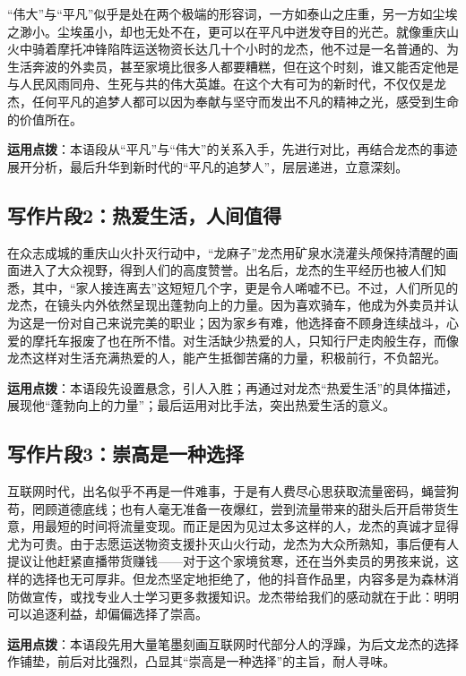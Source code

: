 “伟大”与“平凡”似乎是处在两个极端的形容词，一方如泰山之庄重，另一方如尘埃之渺小。尘埃虽小，却也无处不在，更可以在平凡中迸发夺目的光芒。就像重庆山火中骑着摩托冲锋陷阵运送物资长达几十个小时的龙杰，他不过是一名普通的、为生活奔波的外卖员，甚至家境比很多人都要糟糕，但在这个时刻，谁又能否定他是与人民风雨同舟、生死与共的伟大英雄。在这个大有可为的新时代，不仅仅是龙杰，任何平凡的追梦人都可以因为奉献与坚守而发出不凡的精神之光，感受到生命的价值所在。

\textbf{运用点拨}：本语段从“平凡”与“伟大”的关系入手，先进行对比，再结合龙杰的事迹展开分析，最后升华到新时代的“平凡的追梦人”，层层递进，立意深刻。

\subsection*{写作片段2：热爱生活，人间值得}

在众志成城的重庆山火扑灭行动中，“龙麻子”龙杰用矿泉水浇灌头颅保持清醒的画面进入了大众视野，得到人们的高度赞誉。出名后，龙杰的生平经历也被人们知悉，其中，“家人接连离去”这短短几个字，更是令人唏嘘不已。不过，人们所见的龙杰，在镜头内外依然呈现出蓬勃向上的力量。因为喜欢骑车，他成为外卖员并认为这是一份对自己来说完美的职业；因为家乡有难，他选择奋不顾身连续战斗，心爱的摩托车报废了也在所不惜。对生活缺少热爱的人，只知行尸走肉般生存，而像龙杰这样对生活充满热爱的人，能产生抵御苦痛的力量，积极前行，不负韶光。

\textbf{运用点拨}：本语段先设置悬念，引人入胜；再通过对龙杰“热爱生活”的具体描述，展现他“蓬勃向上的力量”；最后运用对比手法，突出热爱生活的意义。

\subsection*{写作片段3：崇高是一种选择}

互联网时代，出名似乎不再是一件难事，于是有人费尽心思获取流量密码，蝇营狗苟，罔顾道德底线；也有人毫无准备一夜爆红，尝到流量带来的甜头后开启带货生意，用最短的时间将流量变现。而正是因为见过太多这样的人，龙杰的真诚才显得尤为可贵。由于志愿运送物资支援扑灭山火行动，龙杰为大众所熟知，事后便有人提议让他赶紧直播带货赚钱——对于这个家境贫寒，还在当外卖员的男孩来说，这样的选择也无可厚非。但龙杰坚定地拒绝了，他的抖音作品里，内容多是为森林消防做宣传，或找专业人士学习更多救援知识。龙杰带给我们的感动就在于此：明明可以追逐利益，却偏偏选择了崇高。

\textbf{运用点拨}：本语段先用大量笔墨刻画互联网时代部分人的浮躁，为后文龙杰的选择作铺垫，前后对比强烈，凸显其“崇高是一种选择”的主旨，耐人寻味。

